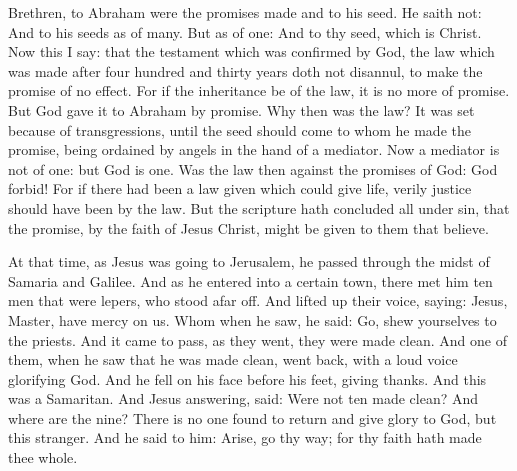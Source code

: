 \begin{multicols}{2}
Brethren, to Abraham were the promises made and to his seed. He saith not:
And to his seeds as of many. But as of one: And to thy seed, which is
Christ.
Now this I say: that the testament which was confirmed by God, the
law which was made after four hundred and thirty years doth not
disannul, to make the promise of no effect.
For if the inheritance be of the law, it is no more of promise.
But God gave it to Abraham by promise.
Why then was the law? It was set because of transgressions, until
the seed should come to whom he made the promise, being ordained by
angels in the hand of a mediator.
Now a mediator is not of one: but God is one.
Was the law then against the promises of God: God forbid!  For if
there had been a law given which could give life, verily justice should
have been by the law.
But the scripture hath concluded all under sin, that the promise,
by the faith of Jesus Christ, might be given to them that believe.



At that time, as Jesus was going to Jerusalem, he passed
through the midst of Samaria and Galilee.
And as he entered into a certain town, there met him ten men that
were lepers, who stood afar off.
And lifted up their voice, saying: Jesus, Master, have mercy on
us.
Whom when he saw, he said: Go, shew yourselves to the priests.
And it came to pass, as they went, they were made clean.
And one of them, when he saw that he was made clean, went back,
with a loud voice glorifying God.
And he fell on his face before his feet, giving thanks.  And this
was a Samaritan.
And Jesus answering, said: Were not ten made clean? And where are
the nine?
There is no one found to return and give glory to God, but this
stranger.
And he said to him: Arise, go thy way; for thy faith hath made
thee whole.


\bigskip




\end{multicols}
